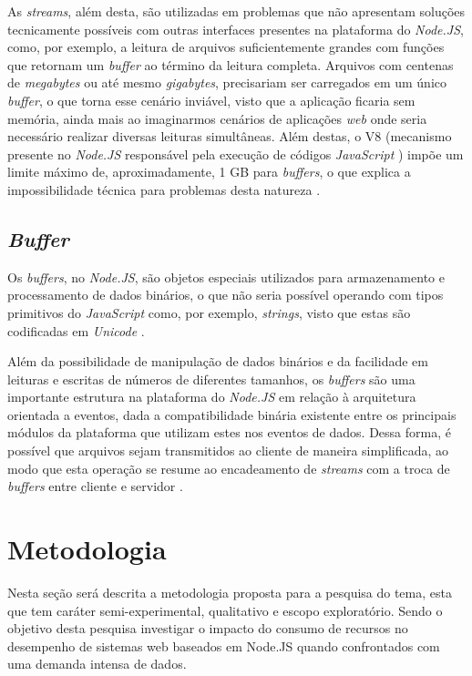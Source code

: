 \documentclass[12pt]{article}
\begin{document}
As \textit{streams}, além desta, são utilizadas em problemas que não apresentam soluções tecnicamente
possíveis com outras interfaces presentes na plataforma do \textit{Node.JS}, como, por exemplo, a leitura de 
arquivos suficientemente grandes com funções que retornam um \textit{buffer} ao término da leitura completa. Arquivos com 
centenas de \textit{megabytes} ou até mesmo \textit{gigabytes}, precisariam ser carregados em um único 
\textit{buffer}, o que torna esse cenário inviável, visto que a aplicação ficaria sem memória, ainda mais ao 
imaginarmos cenários de aplicações  \textit{web} onde seria necessário realizar diversas leituras simultâneas.
Além destas, o V8 (mecanismo presente no \textit{Node.JS} responsável pela execução de códigos \textit{JavaScript} \cite{NODEV8}) impõe 
um limite máximo de, aproximadamente, 1 GB para \textit{buffers}, o que explica a impossibilidade técnica para problemas 
desta natureza \cite[p. 122]{MARIO}.

\subsection{\textit{Buffer}}

Os \textit{buffers}, no \textit{Node.JS}, são objetos especiais utilizados para armazenamento e processamento 
de dados binários, o que não seria possível operando com tipos primitivos do \textit{JavaScript} como, por exemplo,
\textit{strings}, visto que estas são codificadas em \textit{Unicode} \cite[p. 29]{DIOGORESENDE}.

Além da possibilidade de manipulação de dados binários e da facilidade em leituras e escritas de números de diferentes 
tamanhos, os \textit{buffers} são uma importante estrutura na plataforma do \textit{Node.JS} em relação à arquitetura
orientada a eventos, dada a compatibilidade binária existente entre os principais módulos da plataforma que 
utilizam estes nos eventos de dados. Dessa forma, é possível que arquivos sejam transmitidos ao cliente de maneira 
simplificada, ao modo que esta operação se resume ao encadeamento de \textit{streams} com a troca de 
\textit{buffers} entre cliente e servidor \cite[p. 29]{DIOGORESENDE}.


\section{Metodologia}


Nesta seção será descrita a metodologia proposta para a pesquisa do tema, esta que tem caráter semi-experimental, qualitativo
e escopo exploratório. Sendo o objetivo desta pesquisa investigar o impacto do consumo de recursos no desempenho de sistemas
web baseados em Node.JS quando confrontados com uma demanda intensa de dados.
\end{document}
